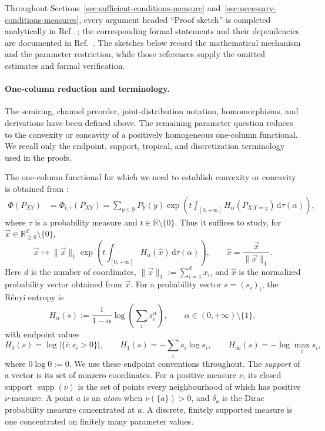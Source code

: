 \documentclass[aps,pra,11pt,onecolumn,nofootinbib,tightenlines]{revtex4-2}
\theoremstyle{definition}
\def \d {\mathrm{d}}
\newcommand{\Y}{\mathcal{Y}}
\newcommand{\R}{\mathbb{R}}
\begin{document}
Throughout Sections~\ref{sec:sufficient-conditions-measure}
and~\ref{sec:necessary-conditions-measures}, every argument headed ``Proof sketch''
is completed analytically in Ref.~\cite{rubboli2026parametersFull}; the corresponding
formal statements and their dependencies are documented in
Ref.~\cite{rubboli2026parametersLean}.  The sketches below record the mathematical
mechanism and the parameter restriction, while those references supply the omitted
estimates and formal verification.

\paragraph{One-column reduction and terminology.}
The semiring, channel preorder, joint-distribution notation, homomorphisms, and
derivations have been defined above.  The remaining parameter question reduces to
the convexity or concavity of a positively homogeneous one-column functional.  We
recall only the endpoint, support, tropical, and discretization terminology used in
the proofs.

The one-column functional for which we need to establish convexity or concavity is
obtained from \ParameterMainTemperateForm:
\begin{align}
\label{eq:TemperateForm}
\Phi(P_{XY})&=\Phi_{t,\tau}(P_{XY})
=\sum_{y\in\Y}P_Y(y)
  \exp\!\left(t\int_{[0,+\infty]}H_\alpha(P_{X|Y=y})\,
  \d\tau(\alpha)\right),
\end{align}
where $\tau$ is a probability measure and
$t\in\R\setminus\{0\}$.  Thus it suffices to study, for
$\vec{x}\in\R^d_{\geq0}\setminus\{0\}$,
\begin{equation}
\label{eq:conditionfunct}
\vec{x}\longmapsto
\|\vec{x}\|_1\exp\!\left(
t\int_{[0,+\infty]}H_\alpha(\hat{x})\,\d\tau(\alpha)
\right),
\qquad
\hat{x}=\frac{\vec{x}}{\|\vec{x}\|_1}.
\end{equation}
Here $d$ is the number of coordinates,
$\|\vec{x}\|_1:=\sum_{i=1}^d x_i$, and $\hat{x}$ is the normalized probability
vector obtained from $\vec{x}$.  For a probability vector $s=(s_i)_i$, the
R\'enyi entropy is
\[
H_\alpha(s):=\frac{1}{1-\alpha}\log\!\left(\sum_i s_i^\alpha\right),
\qquad \alpha\in(0,+\infty)\setminus\{1\},
\]
with endpoint values
\[
H_0(s)=\log|\{i:s_i>0\}|,
\qquad
H_1(s)=-\sum_i s_i\log s_i,
\qquad
H_\infty(s)=-\log\max_i s_i,
\]
where $0\log0:=0$.  We use these endpoint conventions throughout.  The
\emph{support} of a
vector is its set of nonzero coordinates.  For a positive measure $\nu$, its
closed support $\operatorname{supp}(\nu)$ is the set of points every
neighbourhood of which has positive $\nu$-measure.  A point $a$ is an
\emph{atom} when $\nu(\{a\})>0$, and $\delta_a$ is the Dirac probability
measure concentrated at $a$.  A discrete, finitely supported measure is one
concentrated on finitely many parameter values.
\end{document}
